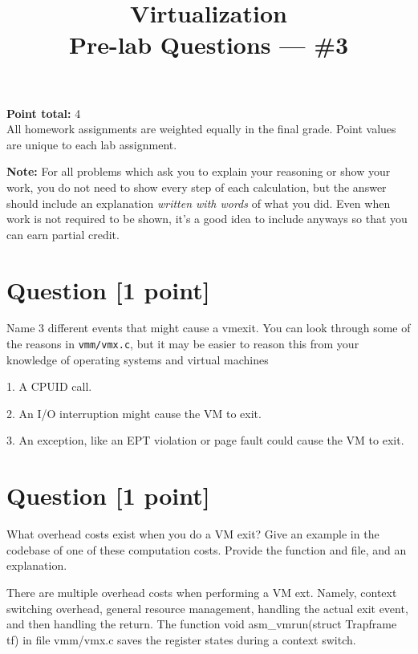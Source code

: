 \documentclass[11pt]{article}
\providecommand{\due}{}
\begin{document}
\title{Virtualization\\Pre-lab Questions --- \#3}
\date{\due}

\maketitle

\noindent \textbf{Point total:} 4
\\ All homework assignments are weighted equally in the final grade. Point values are unique to each lab assignment.

\textbf{Note:} For all problems which ask you to explain your reasoning or show your work, you do not need to show every step of each calculation, but the answer should include an explanation \emph{written with words} of what you did.  Even when work is not required to be shown, it’s a good idea to include anyways so that you can earn partial credit.

\section{Question [1 point]}

Name 3 different events that might cause a vmexit. You can look through some of the reasons in \texttt{vmm/vmx.c}, but it may be easier to reason this from your knowledge of operating systems and virtual machines

\begin{solution}
1. A CPUID call.

2. An I/O interruption might cause the VM to exit.

3. An exception, like an EPT violation or page fault could cause the VM to exit. 
\end{solution}


\section{Question [1 point]}

What overhead costs exist when you do a VM exit? Give an example in the codebase of one of these computation costs. Provide the function and file, and an explanation.

\begin{solution}
There are multiple overhead costs when performing a VM ext. Namely, context switching overhead, general resource management, handling the actual exit event, and then handling the return.
The function void asm\_vmrun(struct Trapframe tf) in file vmm/vmx.c saves the register states during a context switch.
\end{solution}
\end{document}
